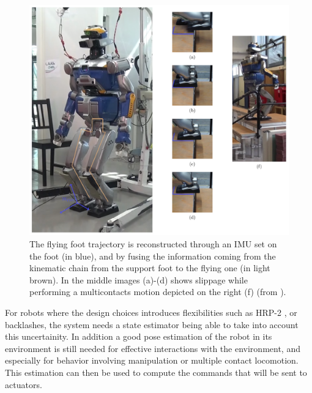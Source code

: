 \begin{figure}
\centering
\includegraphics[width=\linewidth]{./figures/cover-figure.pdf}
	\caption{The flying foot trajectory is reconstructed through an IMU set on the foot (in blue), and by fusing the information coming from the kinematic chain
        from the support foot to the flying one (in light brown). In the middle images (a)-(d) shows slippage while performing a multicontacts motion depicted on the
        right (f) (from \cite{Carpentier:ICRA:2016}).
 }
	\label{fig:cover}
\end{figure}

For robots where the design choices introduces flexibilities such as HRP-2 \cite{Nakaoka:iros:2007}, or backlashes,
the system needs a state estimator being able to take into account this uncertainity.
In addition a good pose estimation of the robot in its environment is still needed for effective interactions with the environment,
and especially for behavior involving manipulation or multiple contact locomotion.
This estimation can then be used to compute the commands that will be sent to actuators.
%
%

